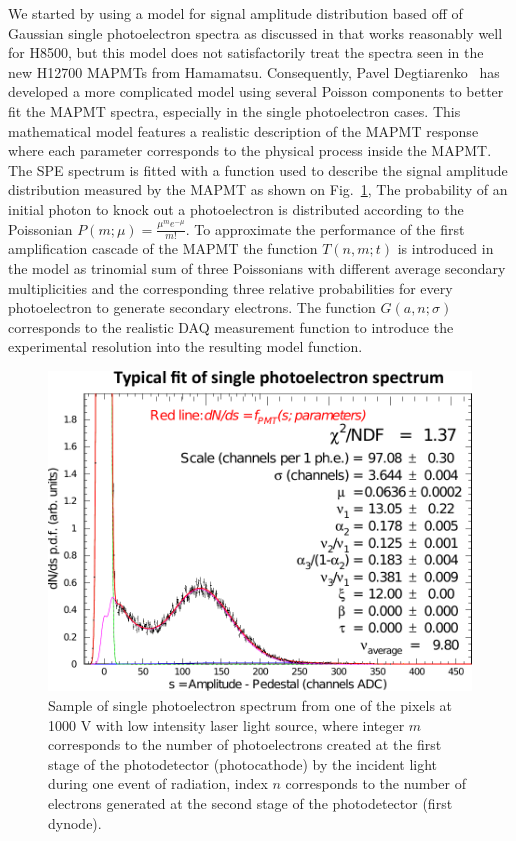 We started by using a model for signal amplitude distribution based off of Gaussian single photoelectron spectra as discussed in \cite{Bellamy:1994bv} that works reasonably well for H8500, but this model does not satisfactorily treat the spectra seen in the new H12700 MAPMTs from Hamamatsu. Consequently, Pavel Degtiarenko~\cite{DEGTIARENKO20171} has developed a more complicated model using several Poisson components to better fit the MAPMT spectra, especially in the single photoelectron cases.
This mathematical model features a realistic description of the MAPMT response where each parameter corresponds to the physical process inside the MAPMT.
The SPE spectrum is fitted with a function used to describe the signal amplitude distribution measured by the MAPMT as shown on Fig.~\ref{fig:SPEfit},
The probability of an initial photon to knock out a photoelectron is distributed according to the Poissonian $P(m;\mu)=\frac{\mu^me^{-\mu}}{m!}$.
To approximate the performance of the first amplification cascade of the MAPMT the function $T(n,m;t)$ is introduced in the model as trinomial sum of three Poissonians with different average secondary multiplicities and the corresponding three relative probabilities for every photoelectron to generate secondary electrons.
The function $G(a,n;\sigma)$ corresponds to the realistic DAQ measurement function to introduce the experimental resolution into the resulting model function.

\begin{figure}[bt]
	\centering
	\includegraphics[width=\linewidth]{figures/SPEfit.pdf}
	\caption{Sample of single photoelectron spectrum from one of the pixels at 1000 V with low intensity laser light source,
where integer $m$ corresponds to the number of photoelectrons created at the first stage of the photodetector (photocathode) by the incident light during one event of radiation, index $n$ corresponds to the number of electrons generated at the second stage of the photodetector (first dynode).
}
\label{fig:SPEfit}
\end{figure}


